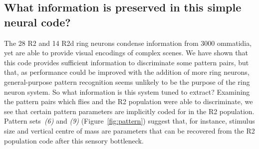 \begin{comment}
Sig:
above: 8; below: 0; eq: 0; not given: 0; tot: 8
------
NS:
above: 5; below: 13; eq: 0; not given: 1; tot: 19
------
Sig not given:
above: 3; eq: 3; below: 0; not given: 3; tot: 9
------
tot tot: 36
\end{comment}

\subsection*{What information is preserved in this simple neural code?}
The 28 R2 and 14 R2d ring neurons condense information from 3000 ommatidia, yet are able to provide visual encodings of complex scenes. We have shown that this code provides sufficient information to discriminate some pattern pairs, but that, as performance could be improved with the addition of more ring neurons, general-purpose pattern recognition seems unlikely to be the purpose of the ring neuron system. So what information is this system tuned to extract? Examining the pattern pairs which flies and the R2 population were able to discriminate, we see that certain pattern parameters are implicitly coded for in the R2 population. Pattern sets~\emph{(6)} and \emph{(9)} (Figure~\ref{fig:pattern}) suggest that, for instance, stimulus size and vertical centre of mass are parameters that can be recovered from the R2 population code after this sensory bottleneck.

